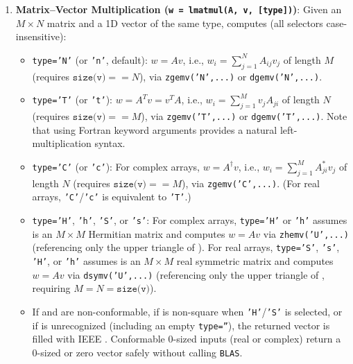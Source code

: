 \begin{enumerate}
  \item \textbf{Matrix--Vector Multiplication (\texttt{w = lmatmul(A, v, [type])})}:
  Given an $M\times N$ matrix  and a 1D vector  of the same type, computes (all  selectors case-insensitive):
  \begin{itemize}
    \item \texttt{type='N'} (or \texttt{'n'}, default): $w = A v$, i.e., $w_i = \sum_{j=1}^{N} A_{ij} v_j$ of length $M$ (requires $\texttt{size(v)} == N$), via \texttt{zgemv('N',...)} or \texttt{dgemv('N',...)}.
    \item \texttt{type='T'} (or \texttt{'t'}): $w = A^T v = v^T A$, i.e., $w_i = \sum_{j=1}^{M} v_j A_{ji}$ of length $N$ (requires $\texttt{size(v)} == M$), via \texttt{zgemv('T',...)} or \texttt{dgemv('T',...)}. Note that using Fortran keyword arguments  provides a natural left-multiplication syntax.
    \item \texttt{type='C'} (or \texttt{'c'}): For complex arrays, $w = A^\dagger v$, i.e., $w_i = \sum_{j=1}^{M} A_{ji}^* v_j$ of length $N$ (requires $\texttt{size(v)} == M$), via \texttt{zgemv('C',...)}. (For real arrays, \texttt{'C'}/\texttt{'c'} is equivalent to \texttt{'T'}.)
    \item \texttt{type='H'}, \texttt{'h'}, \texttt{'S'}, or \texttt{'s'}: For complex arrays, \texttt{type='H'} or \texttt{'h'} assumes  is an $M\times M$ Hermitian matrix and computes $w = A v$ via \texttt{zhemv('U',...)} (referencing only the upper triangle of ). For real arrays, \texttt{type='S'}, \texttt{'s'}, \texttt{'H'}, or \texttt{'h'} assumes  is an $M\times M$ real symmetric matrix and computes $w = A v$ via \texttt{dsymv('U',...)} (referencing only the upper triangle of , requiring $M = N = \texttt{size(v)}$).
    \item If  and  are non-conformable, if  is non-square when \texttt{'H'}/\texttt{'S'} is selected, or if  is unrecognized (including an empty \texttt{type=''}), the returned vector  is filled with IEEE . Conformable 0-sized inputs (real or complex) return a 0-sized or zero vector safely without calling \texttt{BLAS}.
  \end{itemize}
\end{enumerate}


